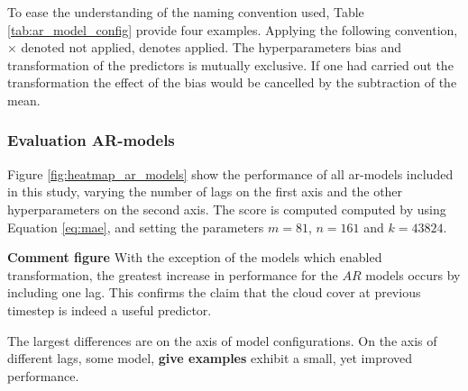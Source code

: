 To ease the understanding of the naming convention used, Table \ref{tab:ar_model_config} provide four examples. Applying the following convention, $\times$ denoted not applied, \checked denotes applied.
The hyperparameters bias and transformation of the predictors is mutually exclusive. If one had carried out the transformation the effect of the bias would be cancelled by the subtraction of the mean. 
\begin{table}[h]
    \centering
    \caption{Example configuration of \acrshort{ar}-models, where $\times$ denoted not applied, \checked denotes applied.}
    \label{tab:ar_model_config}
\end{table}

\subsubsection{Evaluation AR-models}
Figure \ref{fig:heatmap_ar_models} show the performance of all \acrshort{ar}-models included in this study, varying the number of lags on the first axis and the other hyperparameters on the second axis. The score is computed computed by using Equation \eqref{eq:mae}, and setting the parameters $m = 81$, $n=161$ and $k=43824$. 

\textbf{Comment figure}
With the exception of the models which enabled transformation, the greatest increase in performance for the $AR$ models occurs by including one lag. This confirms the claim that the cloud cover at previous timestep is indeed a useful predictor. 

The largest differences are on the axis of model configurations. On the axis of different lags, some model, \textbf{give examples} exhibit a small, yet improved performance. 


